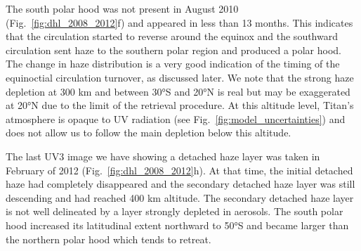 The south polar hood was not present in August 2010 (Fig.~\ref{fig:dhl_2008_2012}f) and appeared in less than 13 months.
This indicates that the circulation started to reverse around the equinox and the southward circulation sent haze to
the southern polar region and produced a polar hood. The change in haze distribution
is a very good indication of the timing of the equinoctial circulation turnover, as  discussed later. We note
that the strong haze depletion at 300 km and between \ang{30}S and \ang{20}N is real but may be exaggerated at \ang{20}N
due to the limit of the retrieval procedure. At this altitude level, Titan's atmosphere is opaque to UV radiation
(see Fig.~\ref{fig:model_uncertainties}) and does not allow us to follow the main depletion below this altitude.

The last UV3 image we have showing a detached haze layer was taken in February of 2012 (Fig.~\ref{fig:dhl_2008_2012}h). At that
time, the initial detached haze had completely disappeared and the secondary detached haze layer was still descending
and had reached 400 km altitude. The secondary detached haze layer is not well delineated by a layer strongly depleted in aerosols.
The south polar hood increased its latitudinal extent northward to \ang{50}S and became larger than the northern
polar hood which tends to retreat.
